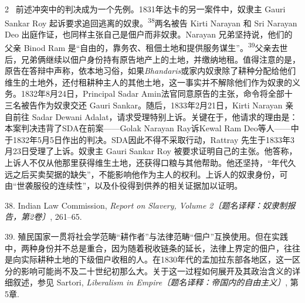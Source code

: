 \documentclass[10pt,a4paper]{article}
\begin{document}
\begin{paracol}{2}
\switchcolumn*
{\scriptsize\color{gray} [p. 9]}\ 前述冲突中的判决成为一个先例。1831年达卡的另一案件中，奴隶主 Gauri Sankar Roy 起诉要求追回逃离的奴\mbox{隶。\textsuperscript{38}}两名被告 Kirti Narayan 和 Sri Narayan Deo 出庭作证，也同样主张自己是佃户而非奴隶。Narayan 兄弟坚持说，他们的父亲 Binod Ram 是“自由的，靠务农、租佃土地和提供服务谋生”。\nobreak\textsuperscript{39}父亲去世后，兄弟俩继续以佃户身份持有原告地产上的土地，并缴纳地租。值得注意的是，原告在答辩中声称，依本地习俗，如果\textit{Bhandaris}或家内奴隶除了耕种分配给他们维生的土地外，还付租耕种主人的其他土地，这一事实并不解除他们作为奴隶的义务。1832年8月24日，Principal Sadar Amin法官同意原告的主张，命令将全部十三名被告作为奴隶交还 Gauri Sankar。随后，1833年2月21日，Kirti Narayan 亲自前往 Sadar Dewani Adalat，请求受理特别上诉。关键在于，他请求的理由是：本案判决违背了SDA在前案——Golak Narayan Ray诉Kewal Ram Deo等人——中于1832年5月5日作出的判决。SDA因此不得不采取行动，Rattray 先生于1833年3月23日受理了上诉。奴隶主 Gauri Sankar Roy 被要求证明自己的主张。他答称，上诉人不仅从他那里获得维生土地，还获得口粮与其他帮助。他还坚持，“年代久远之后买卖契据的缺失”，不能影响他作为主人的权利。上诉人的奴隶身份，可由“世袭服役的连续性”，以及仆役得到供养的相关证据加以证明。\par{\small 38. Indian Law Commission, \textit{Report on Slavery, Volume 2〔题名译释：奴隶制报告，第2卷〕}, 261–65.\par}{\small 39. 殖民国家一贯将社会学范畴“耕作者”与法律范畴“佃户”互换使用。但在实践中，两种身份并不总是重合，因为随着税收链条的延长，法律上界定的佃户，往往是向实际耕种土地的下级佃户收租的人。在1830年代的孟加拉东部各地区，这一区分的影响可能尚不及二十世纪初那么大。关于这一过程如何展开及其政治含义的详细叙述，参见 Sartori, \textit{Liberalism in Empire〔题名译释：帝国内的自由主义〕}, 第5章.\par}
\switchcolumn

\end{paracol}
\end{document}

